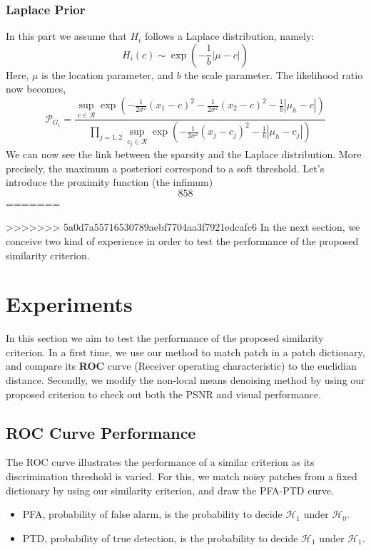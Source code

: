 \documentclass[runningheads]{llncs}
\newcommand{\wdist}[3]{\frac{1}{2#3}(#1-#2 )^2}
\begin{document}
\subsubsection{Laplace Prior}
In this part we assume that $H_i$ follows a Laplace distribution, namely:
\begin{equation}
 H_i(c) \sim \exp(-\frac{1}{b}|\mu-c|)
\end{equation}
Here, $\mu$ is the location parameter, and $b$ the scale parameter. The likelihood ratio now becomes,
\[
 \mathcal{P}_{G_i} = \frac{\sup_{c\in \mathcal{R}} \exp(-\wdist{x_1}{c}{\sigma^2}-\wdist{x_2}{c}{\sigma^2}-\frac{1}{b}|\mu_h-c|) }
{\prod_{j=1,2}\sup_{c_j\in \mathcal{R}} \exp(-\frac{1}{2\sigma^2}(x_j-c_j )^2-\frac{1}{b}|\mu_h-c_j|)  }
\]
We can now see the link between the sparsity and the Laplace distribution. More precisely, the maximum a posteriori correspond to a soft threshold. Let's introduce the proximity function (the infimum)
\[
858
\]
=======

>>>>>>> 5a0d7a55716530789aebf7704aa3f7921edcafc6
In the next section, we conceive two kind of experience in order to test the performance of the proposed similarity criterion.

\section{Experiments}
In this section we aim to test the performance of the proposed similarity criterion. In a first time, we use our method to match patch in a patch dictionary, and compare its \textbf{ROC} curve (Receiver operating characteristic) to the euclidian distance. Secondly, we modify the non-local means denoising method by using our proposed criterion to check out both the PSNR and visual performance.
\subsection{ROC Curve Performance}
The ROC curve illustrates the performance of a similar criterion as its discrimination threshold is varied. For this, we match noisy patches from a fixed dictionary by using our similarity criterion, and draw the PFA-PTD curve. 
\begin{itemize}
 \item PFA, probability of false alarm, is the probability to decide $\mathcal{H}_1$ under $\mathcal{H}_0$.
 \item PTD, probability of true detection, is the probability to decide $\mathcal{H}_1$ under $\mathcal{H}_1$.
\end{itemize}
\end{document}
